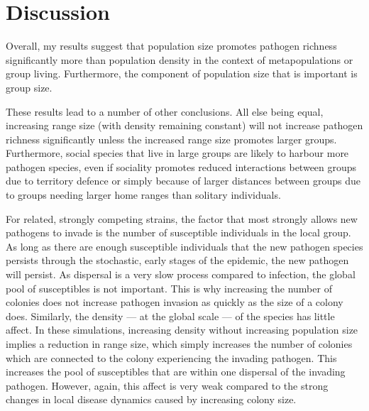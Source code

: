 \section{Discussion}



Overall, my results suggest that population size promotes pathogen richness significantly more than population density in the context of metapopulations or group living.
Furthermore, the component of population size that is important is group size.

These results lead to a number of other conclusions.
All else being equal, increasing range size (with density remaining constant) will not increase pathogen richness significantly unless the increased range size promotes larger groups.
Furthermore, social species that live in large groups are likely to harbour more pathogen species, even if sociality promotes reduced interactions between groups due to territory defence or simply because of larger distances between groups due to groups needing larger home ranges than solitary individuals.



For related, strongly competing strains, the factor that most strongly allows new pathogens to invade is the number of susceptible individuals in the local group.
As long as there are enough susceptible individuals that the new pathogen species persists through the stochastic, early stages of the epidemic, the new pathogen will persist.
As dispersal is a very slow process compared to infection, the global pool of susceptibles is not important. 
This is why increasing the number of colonies does not increase pathogen invasion as quickly as the size of a colony does.
Similarly, the density --- at the global scale --- of the species has little affect.
In these simulations, increasing density without increasing population size implies a reduction in range size, which simply increases the number of colonies which are connected to the colony experiencing the invading pathogen.
This increases the pool of susceptibles that are within one dispersal of the invading pathogen.
However, again, this affect is very weak compared to the strong changes in local disease dynamics caused by increasing colony size.



